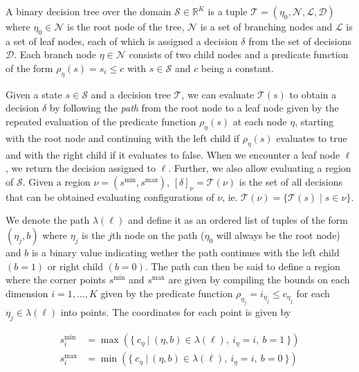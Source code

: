 \begin{definition}%
\label{def:decisionTree}
    A binary decision tree over the domain $\mathcal{S} \in \mathbb{R}^K$ is a
    tuple $\mathcal{T} = (\eta_{0}, \mathcal{N}, \mathcal{L}, \mathcal{D})$
    where $\eta_{0} \in \mathcal{N}$ is the root node of the tree, $\mathcal{N}$
    is a set of branching nodes and $\mathcal{L}$ is a set of leaf nodes, each
    of which is assigned a decision $\delta$ from the set of decisions
    $\mathcal{D}$. Each branch node $\eta \in \mathcal{N}$ consists of two child
    nodes and a predicate function of the form $\rho_{\eta}(s) = s_{i} \leq c$ with $s
    \in \mathcal{S}$ and $c$ being a constant.
\end{definition}

\noindent
Given a state $s \in \mathcal{S}$ and a decision tree $\mathcal{T}$, we can
evaluate $\mathcal{T}(s)$ to obtain a decision $\delta$ by following the
\textit{path} from the root node to a leaf node given by the repeated evaluation
of the predicate function $\rho_{\eta}(s)$ at each node $\eta$, starting with
the root node and continuing with the left child if $\rho_{\eta}(s)$ evaluates
to true and with the right child if it evaluates to false. When we encounter a
leaf node $\ell$, we return the decision assigned to $\ell$. Further, we also
allow evaluating a region of $\mathcal{S}$.  Given a region $\nu = (s^{\min},
s^{\max})$, $[\delta]_{\nu} = \mathcal{T}(\nu)$ is the set of all decisions that
can be obtained evaluating configurations of $\nu$, ie. $\mathcal{T}(\nu) = \{
\mathcal{T}(s) \mid s \in \nu \}$.

We denote the path
$\lambda(\ell)$ and define it as an ordered list of tuples of the form
$(\eta_j, b)$ where $\eta_j$ is the $j$th node on the path ($\eta_0$ will always
be the root node) and $b$ is a binary value indicating wether the path continues
with the left child $(b = 1)$ or right child $(b = 0)$.
The path can then be said to define a region where the corner points $s^{\min}$
and $s^{\max}$ are given by compiling the bounds on each dimension $i =
1,\ldots,K$ given by the predicate function $\rho_{\eta_j} = i_{\eta_j} \leq
c_{\eta_j}$ for each $\eta_j \in \lambda(\ell)$ into points. The coordinates for
each point is given by

\begin{align*}
    s^{\min}_i&= \max(\{\>
        c_{\eta}\> |\>
        (\eta, b) \in \lambda(\ell),\>
        i_{\eta} = i, \>
        b = 1\>
    \}) \\
    s^{\max}_i&= \min(\{\>
        c_{\eta}\> |\>
        (\eta, b) \in \lambda(\ell),\>
        i_{\eta} = i,\>
        b = 0\>
    \})
\end{align*}


